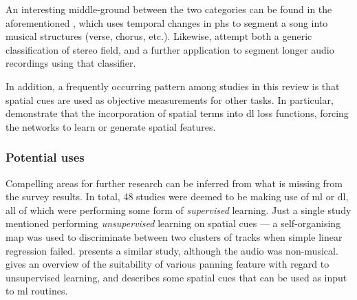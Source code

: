 \documentclass[referee,pdflatex,sn-mathphys-num]{sn-jnl}%
\begin{document}
An interesting middle-ground between the two categories can be found in the aforementioned \cite{barryMusicStructureSegmentation2007}, which uses temporal changes in \glspl{ph} to segment a song into musical structures (verse, chorus, etc.). Likewise, \cite{harmaClassificationTimefrequencyRegions2011,harmaStereoAudioClassification2011} attempt both a generic classification of stereo field, and a further application to segment longer audio recordings using that classifier.

In addition, a frequently occurring pattern among studies in this review is that spatial cues are used as objective measurements for other tasks. In particular, \cite{erruzBinauralSourceSeparation2017,zhuAmbisonicBinaural2022,limEnhancingSpatialAudio2024,giampiccoloModelingImpulseResponse2025} demonstrate that the incorporation of spatial terms into \gls{dl} loss functions, forcing the networks to learn or generate spatial features.


\subsubsection{Potential uses}
\label{sec:potential_uses_of_sips}
Compelling areas for further research can be inferred from what is missing from the survey results. In total, 48 studies were deemed to be making use of \gls{ml} or \gls{dl}, all of which were performing some form of \textit{supervised} learning. Just a single study \cite{ziemerGoniometersArePowerful2023} mentioned performing \textit{unsupervised} learning on spatial cues --- a self-organising map was used to discriminate between two clusters of tracks when simple linear regression failed. \cite{wangUnsupervisedDeepLearning2020} presents a similar study, although the audio was non-musical. \cite{miticObjectiveComparisonPanning2025} gives an overview of the suitability of various panning feature with regard to unsupervised learning, and \cite{barryBinaspectPythonLibrary2025} describes some spatial cues that can be used as input to \gls{ml} routines. 
\end{document}
